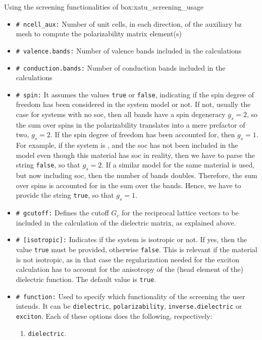 \begin{mybox}{Using the screening functionalities of \xatu}{box:xatu_screening_usage}
    \begin{itemize}
        \item \texttt{\# ncell\_aux:} Number of unit cells, in each direction, of the auxiliary \gls{bz} mesh to compute the polarizability matrix element(s)
        \item \texttt{\# valence.bands:} Number of valence bands included in the calculations
        \item \texttt{\# conduction.bands:} Number of conduction bands included in the calculations
        \item \texttt{\# spin:} It assumes the values \texttt{true} or \texttt{false}, indicating if the spin degree of freedom has been considered in the system model or not. If not, usually the case for systems with no \gls{soc}, then all bands have a spin degeneracy $g_s = 2$, so the sum over spins in the polarizability translates into a mere prefactor of two, $g_s=2$. If the spin degree of freedom has been accounted for, then $g_s=1$.
        For example, if the system is , and the \gls{soc} has not been included in the model even though this material has \gls{soc} in reality, then we have to parse the string \texttt{false}, so that $g_s=2$. If a similar model for the same material is used, but now including \gls{soc}, then the number of bands doubles. Therefore, the sum over spins is accounted for in the sum over the bands. Hence, we have to provide the string \texttt{true}, so that $g_s=1$.
        \item \texttt{\# gcutoff:} Defines the cutoff $G_c$ for the reciprocal lattice vectors to be included in the calculation of the dielectric matrix, as explained above.
        \item \texttt{\# [isotropic]:} Indicates if the system is isotropic or not.
        If yes, then the value \texttt{true} must be provided, otherwise \texttt{false}.
        This is relevant if the material is not isotropic, as in that case the regularization needed for the exciton calculation has to account for the anisotropy of the (head element of the) dielectric function.
        The default value is \texttt{true}.
        \item \texttt{\# function:} Used to specify which functionality of the screening the user intends.
        It can be \texttt{dielectric}, \texttt{polarizability}, \texttt{inverse.dielectric} or \texttt{exciton}.
        Each of these options does the following, respectively:
        \begin{enumerate}
            \item \texttt{dielectric}.

\end{enumerate}
\end{itemize}
\end{mybox}
